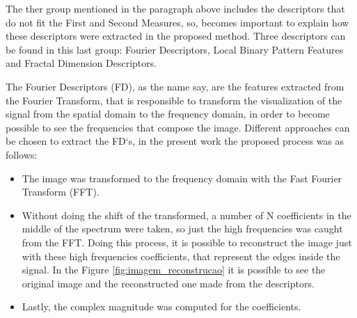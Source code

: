 \documentclass[conference]{IEEEtran}
\begin{document}
		The ther group mentioned in the paragraph above includes the descriptors that do not fit the First and Second Measures, so, becomes important to explain how these descriptors were extracted in the proposed method. Three descriptors can be found in this last group: Fourier Descriptors, Local Binary Pattern Features and Fractal Dimension Descriptors. \par
		The Fourier Descriptors (FD), as the name say, are the features extracted from the Fourier Transform, that is responsible to transform the visualization of the signal from the spatial domain to the frequency domain, in order to become possible to see the frequencies that compose the image. Different approaches can be chosen to extract the FD`s, in the present work the proposed process was as follows:
		\begin{itemize}
		    \item The image was transformed to the frequency domain with the Fast Fourier Transform (FFT).
		    \item Without doing the shift of the transformed, a number of N coefficients in the middle of the spectrum were taken, so just the high frequencies was caught from the FFT. Doing this process, it is possible to reconstruct the image just with these high frequencies coefficients, that represent the edges inside the signal. In the Figure \ref{fig:imagem_reconstrucao} it is possible to see the original image and the reconstructed one made from the descriptors.
		    \item Lastly, the complex magnitude was computed for the coefficients.
		\end{itemize}
		
\end{document}
